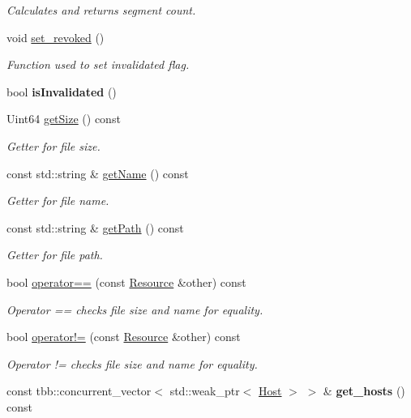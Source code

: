 \begin{DoxyCompactItemize}
\begin{DoxyCompactList}\small\item\em Calculates and returns segment count. \end{DoxyCompactList}\item 
void \hyperlink{classsimpleP2P_1_1Resource_a49e46561e4088f78bb96c07c12d4738c}{set\+\_\+revoked} ()
\begin{DoxyCompactList}\small\item\em Function used to set invalidated flag. \end{DoxyCompactList}\item 
\mbox{\label{classsimpleP2P_1_1Resource_a3b271172c4b67a378c264babbc1d72a1}} 
bool {\bfseries is\+Invalidated} ()
\item 
Uint64 \hyperlink{classsimpleP2P_1_1Resource_adadeb491cccabbce2e1d883f9e8519f7}{get\+Size} () const
\begin{DoxyCompactList}\small\item\em Getter for file size. \end{DoxyCompactList}\item 
const std\+::string \& \hyperlink{classsimpleP2P_1_1Resource_adc12496aedf1729852d2c98bf94428aa}{get\+Name} () const
\begin{DoxyCompactList}\small\item\em Getter for file name. \end{DoxyCompactList}\item 
const std\+::string \& \hyperlink{classsimpleP2P_1_1Resource_a866cdd2e717abf3515629ca73b2f80b8}{get\+Path} () const
\begin{DoxyCompactList}\small\item\em Getter for file path. \end{DoxyCompactList}\item 
bool \hyperlink{classsimpleP2P_1_1Resource_a0b42735bed5ab425b9e26b660ededecf}{operator==} (const \hyperlink{classsimpleP2P_1_1Resource}{Resource} \&other) const
\begin{DoxyCompactList}\small\item\em Operator == checks file size and name for equality. \end{DoxyCompactList}\item 
bool \hyperlink{classsimpleP2P_1_1Resource_a5694c4c5a3d5b303a1fa0dcb3fb478b1}{operator!=} (const \hyperlink{classsimpleP2P_1_1Resource}{Resource} \&other) const
\begin{DoxyCompactList}\small\item\em Operator != checks file size and name for equality. \end{DoxyCompactList}\item 
\mbox{\label{classsimpleP2P_1_1Resource_a4a8773417a0532826c75fdebe84304d3}} 
const tbb\+::concurrent\+\_\+vector$<$ std\+::weak\+\_\+ptr$<$ \hyperlink{classsimpleP2P_1_1Host}{Host} $>$ $>$ \& {\bfseries get\+\_\+hosts} () const
\end{DoxyCompactItemize}
